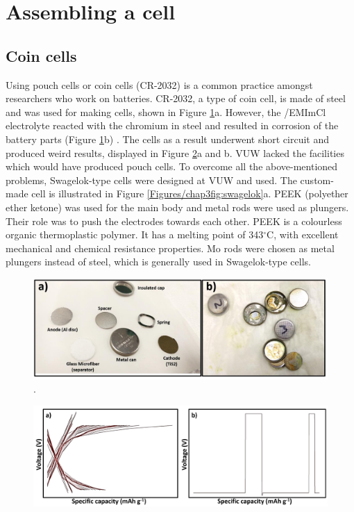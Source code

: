 \section{Assembling a cell}

\subsection*{Coin cells}
Using pouch cells or coin cells (CR-2032\textregistered) is a common practice amongst researchers who work on batteries. CR-2032, a type of coin cell, is made of steel and was used for making cells, shown in Figure \ref{Figures/chap3fig:concell}a. However, the /EMImCl electrolyte reacted with the chromium in steel and resulted in corrosion of the battery parts (Figure \ref{Figures/chap3fig:concell}b) \cite{das_aluminium-ion_2017}. The cells as a result underwent short circuit and produced weird results, displayed in Figure \ref{Figures/chap3fig:weirdcdc}a and b. VUW lacked the facilities which would have produced pouch cells. To overcome all the above-mentioned problems, Swagelok-type cells were designed at VUW and used. The custom-made cell is illustrated in Figure \ref{Figures/chap3fig:swagelok}a. PEEK (polyether ether ketone) was used for the main body and metal rods were used as plungers. Their role was to push the electrodes towards each other. PEEK is a colourless organic thermoplastic polymer. It has a melting point of 343$^{\circ}$C, with excellent mechanical and chemical resistance properties. Mo rods were chosen as metal plungers instead of steel, which is generally used in Swagelok-type cells. 

\begin{figure}[tbh!]
\centering
\includegraphics[width=\textwidth]{Figures/chap3fig/concell.pdf}
\caption{.}
\label{Figures/chap3fig:concell}
\end{figure}

\begin{figure}[tbh!]
\centering
\includegraphics[width=\textwidth]{Figures/chap3fig/weirdcdc.pdf}
\caption{}
\label{Figures/chap3fig:weirdcdc}
\end{figure}

